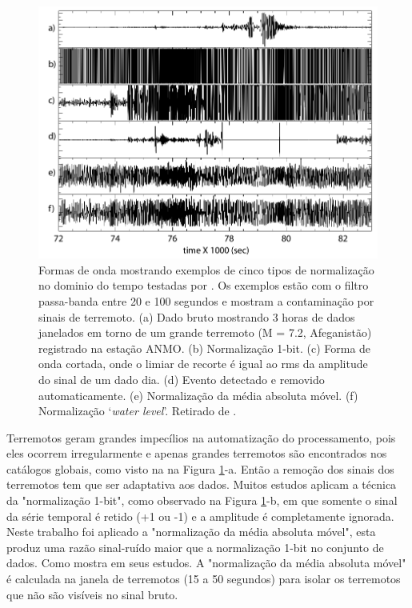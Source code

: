 \begin{figure}[!ht]
\centering
\includegraphics[scale=0.4]{Figs/temporal_norma.png}
\caption[Formas de onda mostrando exemplos de cinco tipos de normalização no dominio do tempo.]{Formas de onda mostrando exemplos de cinco tipos de normalização no dominio do tempo testadas por \cite{bensen_processing_2007}. Os exemplos estão com o filtro passa-banda entre 20 e 100 segundos e mostram a contaminação por sinais de terremoto. (a)  Dado bruto mostrando 3 horas de dados janelados em torno de um grande terremoto (M = 7.2, Afeganistão) registrado na estação ANMO. (b) Normalização 1-bit. (c) Forma de onda cortada, onde o limiar de recorte é igual ao rms da amplitude do sinal de um dado dia. (d) Evento detectado e removido automaticamente. (e) Normalização da média absoluta móvel. (f) Normalização ‘\textit{water level}’. Retirado de \cite{bensen_processing_2007}.}
\label{temporal_norma}
\end{figure} 

Terremotos geram grandes impecílios na automatização do processamento, pois eles ocorrem irregularmente e apenas grandes terremotos são encontrados nos catálogos globais, como visto na na Figura \ref{temporal_norma}-a. Então a remoção dos sinais dos terremotos tem que ser adaptativa aos dados. Muitos estudos aplicam a técnica da "normalização 1-bit", como observado na Figura \ref{temporal_norma}-b, em que somente o sinal da série temporal é retido (+1 ou -1) e a amplitude é completamente ignorada. Neste trabalho foi aplicado a "normalização da média absoluta móvel", esta produz uma razão sinal-ruído maior que a normalização 1-bit no conjunto de dados. Como mostra \cite{seats_improved_2012} em seus estudos. A "normalização da média absoluta móvel" é calculada na janela de terremotos (15 a 50 segundos) para isolar os terremotos que não são visíveis no sinal bruto.

